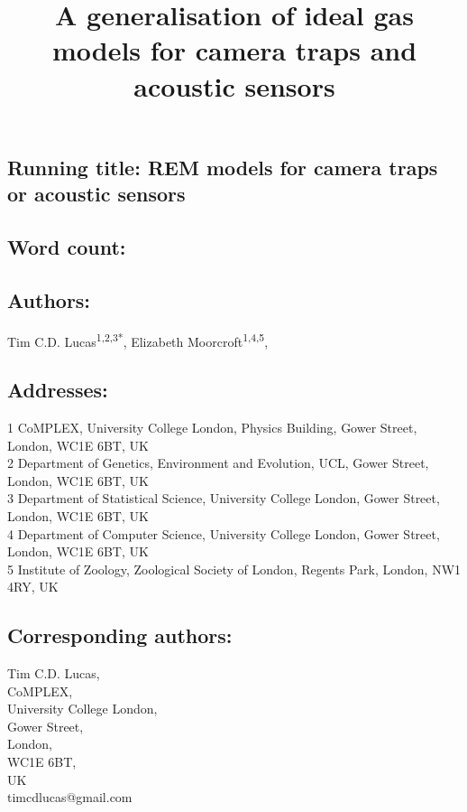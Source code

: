 \documentclass[a4paper,10pt,reqno,oneside]{amsart}
\begin{document}
\title{A generalisation of ideal gas models for camera traps and acoustic sensors}
\maketitle

\subsection*{ Running title: REM models for camera traps or acoustic sensors}

\subsection*{ Word count:}

\subsection*{ Authors:\\}
Tim C.D. Lucas\textsuperscript{1,2,3*}, Elizabeth Moorcroft\textsuperscript{1,4,5}, %


\subsection*{ Addresses:\\}
1 CoMPLEX, University College London, Physics Building, Gower Street, London, WC1E 6BT, UK\\ 
2 Department of Genetics, Environment and Evolution, UCL, Gower Street, London, WC1E 6BT, UK\\ 
3 Department of Statistical Science, University College London, Gower Street, London, WC1E 6BT, UK\\ 
4 Department of Computer Science, University College London, Gower Street, London, WC1E 6BT, UK\\ 
5 Institute of Zoology, Zoological Society of London, Regents Park, London, NW1 4RY, UK


\subsection*{ Corresponding authors:\\}
Tim C.D. Lucas,\\
CoMPLEX,\\
University College London,\\
Gower Street,\\
London,\\
WC1E 6BT, \\
UK\\
timcdlucas@gmail.com\\
\end{document}
